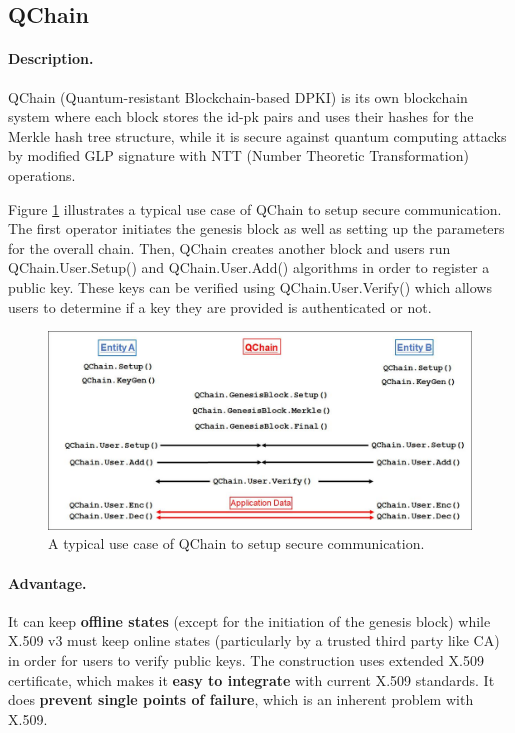 \documentclass[lang=en]{sjtuarticle}
\begin{document}
\subsection{QChain}

\paragraph{Description.}

QChain (Quantum-resistant Blockchain-based DPKI) \cite{an2018qchain} is its own blockchain system where each block stores the id-pk pairs and uses their hashes for the Merkle
hash tree structure, while it is secure against quantum computing attacks by modified GLP signature with NTT (Number Theoretic Transformation) \cite{ntt} operations. 


Figure \ref{fig:QChain} illustrates a typical use case of QChain to setup secure communication. The first operator initiates the genesis
block as well as setting up the parameters for the overall
chain. Then, QChain creates another block and users run \textsf{QChain.User.Setup()} and \textsf{QChain.User.Add()}
algorithms in order to register a public key. These keys can be verified using \textsf{QChain.User.Verify()} which
allows users to determine if a key they are provided is authenticated or not.

\begin{figure}[h]
    \centering
    \includegraphics{QChain.jpg}
    \caption{A typical use case of QChain to setup secure communication.}
    \label{fig:QChain}
\end{figure}

\paragraph{Advantage.} It can keep \textbf{offline states} (except for the initiation
of the genesis block) while X.509 v3 must keep online states (particularly by a trusted third party like CA)
in order for users to verify public keys. The construction uses extended X.509 certificate, which makes it \textbf{easy to integrate} with current X.509 standards. It does \textbf{prevent single points of failure}, which is an inherent
problem with X.509.
\end{document}
